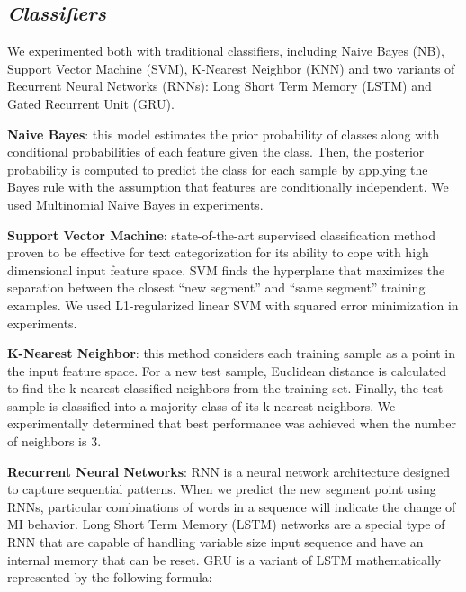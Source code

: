 \documentclass{amia}
\begin{document}
\subsection*{\textit{Classifiers}}

We experimented both with traditional classifiers, including Naive Bayes (NB)\cite{mccallum1998comparison}, Support Vector Machine (SVM)\cite{cortes1995support}, K-Nearest Neighbor (KNN)\cite{keller1985fuzzy} and two variants of Recurrent Neural Networks (RNNs)\cite{lipton2015critical}: Long Short Term Memory (LSTM)\cite{hochreiter1997long} and Gated Recurrent Unit (GRU)\cite{chung2014empirical}. 

\textbf{Naive Bayes}: this model estimates the prior probability of classes along with conditional probabilities of each feature given the class. Then, the posterior probability is computed to predict the class for each sample by applying the Bayes rule with the assumption that features are conditionally independent. We used Multinomial Naive Bayes in experiments.

\textbf{Support Vector Machine}: state-of-the-art supervised classification method proven to be effective for text categorization\cite{joachims1998text} for its ability to cope with high dimensional input feature space. SVM finds the hyperplane that maximizes the separation between the closest ``new segment'' and ``same segment'' training examples. We used L1-regularized linear SVM with squared error minimization in experiments.   

\textbf{K-Nearest Neighbor}: this method considers each training sample as a point in the input feature space. For a new test sample, Euclidean distance is calculated to find the k-nearest classified neighbors from the training set. Finally, the test sample is classified into a majority class of its k-nearest neighbors. We experimentally determined that best performance was achieved when the number of neighbors is 3. 

\textbf{Recurrent Neural Networks}: RNN is a neural network architecture designed to capture sequential patterns. When we predict the new segment point using RNNs, particular combinations of words in a sequence will indicate the change of MI behavior. Long Short Term Memory (LSTM) networks\cite{hochreiter1997long} are a special type of RNN that are capable of handling variable size input sequence and have an internal memory that can be reset. GRU\cite{chung2014empirical} is a variant of LSTM mathematically represented by the following formula:
\end{document}
